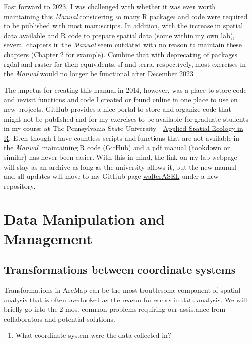 \documentclass[
  letterpaper,
]{book}
\providecommand{\tightlist}{%
  \setlength{\itemsep}{0pt}\setlength{\parskip}{0pt}}\usepackage{longtable,booktabs,array}
\begin{document}
Fast forward to 2023, I was challenged with whether it was even worth
maintaining this \emph{Manual} considering so many R packages and code
were required to be published with most manuscripts. In addition, with
the increase in spatial data available and R code to prepare spatial
data (some within my own lab), several chapters in the \emph{Manual}
seem outdated with no reason to maintain these chapters (Chapter 2 for
example). Combine that with deprecating of packages rgdal and raster for
their equivalents, sf and terra, respectively, most exercises in the
\emph{Manual} would no longer be functional after December 2023.

The impetus for creating this manual in 2014, however, was a place to
store code and revisit functions and code I created or found online in
one place to use on new projects. GitHub provides a nice portal to store
and organize code that might not be published and for my exercises to be
available for graduate students in my course at The Pennsylvania State
University -
\href{https://ecosystems.psu.edu/research/labs/walter-lab/manual}{Applied Spatial Ecology in R}.
Even though I have countless scripts and functions that are not
available in the \emph{Manual}, maintaining R code (GitHub) and a pdf
manual (bookdown or similar) has never been easier. With this in mind,
the link on my lab webpage will stay as an archive as long as the
university allows it, but the new manual and all updates will move to my
GitHub page \href{https://github.com/walterASEL}{walterASEL} under a new
repository.

\part{Data Manipulation and Management}

\hypertarget{transformations-between-coordinate-systems}{%
\chapter{Transformations between coordinate
systems}\label{transformations-between-coordinate-systems}}

Transformations in ArcMap can be the most troublesome component of
spatial analysis that is often overlooked as the reason for errors in
data analysis. We will briefly go into the 2 most common problems
requiring our assistance from collaborators and potential solutions.

\begin{enumerate}
\def\labelenumi{\arabic{enumi}.}
\tightlist
\item
  What coordinate system were the data collected in?
\end{enumerate}
\end{document}
